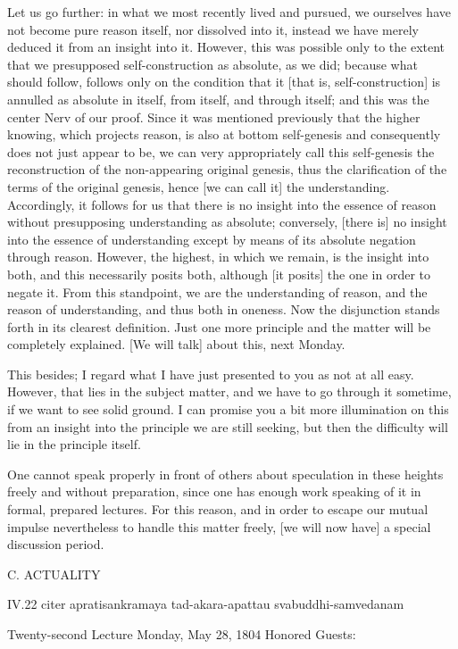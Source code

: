 Let us go further:
in what we most recently lived and pursued,
we ourselves have not become pure reason itself,
nor dissolved into it, instead we have merely
deduced it from an insight into it.
However, this was possible only to the extent
that we presupposed self-construction as absolute, as we did;
because what should follow, follows only
on the condition that it [that is, self-construction] is
annulled as absolute in itself, from itself, and through itself;
and this was the center {Nerv} of our proof.
Since it was mentioned previously that the higher knowing,
which projects reason, is also at bottom self-genesis
and consequently does not just appear to be,
we can very appropriately call this self-genesis
the reconstruction of the non-appearing original genesis,
thus the clarification of the terms of the original genesis,
hence [we can call it] the understanding.
Accordingly, it follows for us that
there is no insight into the essence of reason
without presupposing understanding as absolute;
conversely, [there is] no insight into
the essence of understanding except by
means of its absolute negation through reason.
However, the highest, in which we remain,
is the insight into both,
and this necessarily posits both,
although [it posits] the one in order to negate it.
From this standpoint, we are the understanding of reason,
and the reason of understanding, and thus both in oneness.
Now the disjunction stands forth in its clearest definition.
Just one more principle and the matter will be completely explained.
[We will talk] about this, next Monday.

This besides; I regard what I have just
presented to you as not at all easy.
However, that lies in the subject matter,
and we have to go through it sometime,
if we want to see solid ground.
I can promise you a bit more illumination on this
from an insight into the principle we are still seeking,
but then the difficulty will lie in the principle itself.

One cannot speak properly in front of others about
speculation in these heights freely and without preparation,
since one has enough work speaking of it in formal, prepared lectures.
For this reason, and in order to escape our mutual impulse
nevertheless to handle this matter freely,
[we will now have] a special discussion period.

C. ACTUALITY

IV.22
citer apratisankramaya tad-akara-apattau svabuddhi-samvedanam

Twenty-second Lecture
Monday, May 28, 1804
Honored Guests:

